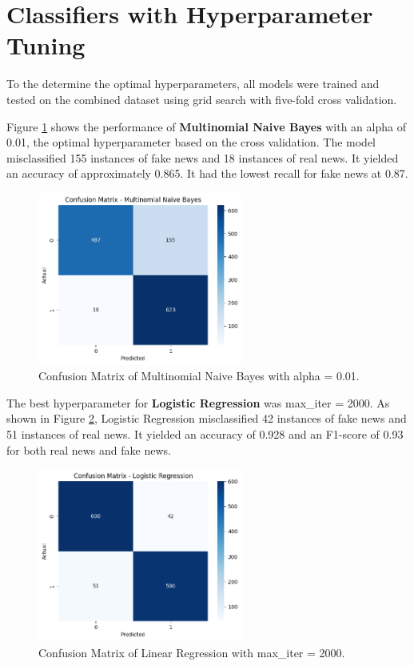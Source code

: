 \section{Classifiers with Hyperparameter Tuning}
\label{sec:ParamTuning}
To the determine the optimal hyperparameters, all models were trained and tested on the combined dataset using grid search with five-fold cross validation.

Figure \ref{MNB_hyperparam} shows the performance of \textbf{Multinomial Naive Bayes} with an alpha of 0.01, the optimal hyperparameter based on the cross validation. The model misclassified 155 instances of fake news and 18 instances of real news. It yielded an accuracy of approximately 0.865. It had the lowest recall for fake news at 0.87.

\begin{figure}[h!]
\centering
\includegraphics[width=0.6\textwidth,height=0.6\textheight, keepaspectratio]{figures/hyperparam/MNB.png}
    \caption{Confusion Matrix of Multinomial Naive Bayes with alpha = 0.01.}
    \label{MNB_hyperparam}
\end{figure}

The best hyperparameter for \textbf{Logistic Regression} was max\_iter = 2000. As shown in Figure \ref{LR_hyperparam}, Logistic Regression misclassified 42 instances of fake news and 51 instances of real news. It yielded an accuracy of 0.928 and an F1-score of 0.93 for both real news and fake news. 

\begin{figure}[h!]
\centering
\includegraphics[width=0.6\textwidth,height=0.6\textheight, keepaspectratio]{figures/hyperparam/LR.png}
    \caption{Confusion Matrix of Linear Regression with max\_iter = 2000.}
    \label{LR_hyperparam}
\end{figure}

